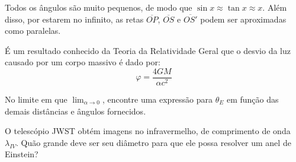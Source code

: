 \documentclass[11pt]{article}
\begin{document}
\begin{pproblem}
    Todos os ângulos são muito pequenos, de modo que \(\sin x \approx \tan x \approx x\). Além disso, por estarem no infinito, as retas \(\overline{OP}\), \(\overline{OS}\) e \(\overline{OS'}\) podem ser aproximadas como paralelas.

    É um resultado conhecido da Teoria da Relatividade Geral que o desvio da luz causado por um corpo massivo é dado por:
    \[\varphi = \frac{4GM}{\alpha c^2}\]
    \begin{alternativas}
        \item No limite em que \(\lim_{\alpha \rightarrow 0}\), encontre uma expressão para \(\theta_E\) em função das demais distâncias e ângulos fornecidos.
    
        \item O telescópio JWST obtém imagens no infravermelho, de comprimento de onda \(\lambda_{IV}\). Quão grande deve ser seu diâmetro para que ele possa resolver um anel de Einstein?
    \end{alternativas}

    
\end{pproblem}
\end{document}
